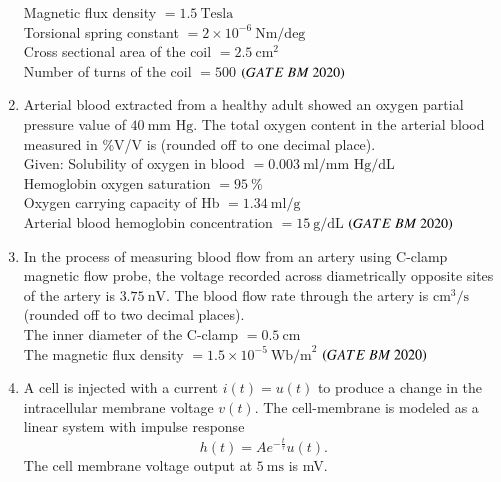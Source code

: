 \documentclass[journal,12pt,onecolumn]{IEEEtran}
\theoremstyle{remark}
\begin{document}
\begin{enumerate}
Magnetic flux density $= 1.5 \ \text{Tesla}$\\

Torsional spring constant $= 2 \times 10^{-6} \ \text{Nm/deg}$\\

Cross sectional area of the coil $= 2.5 \ \text{cm}^2$\\

Number of turns of the coil $= 500$  \hfill $\left(GATE\ BM\ 2020\right)$

\item Arterial blood extracted from a healthy adult showed an oxygen partial pressure 
value of $40 \ \text{mm Hg}$. The total oxygen content in the arterial blood measured 
in \%V/V is \underline{\hspace{2cm}}  (rounded off to one decimal place).\\

Given: Solubility of oxygen in blood $= 0.003 \ \text{ml/mm Hg/dL}$\\

Hemoglobin oxygen saturation $= 95 \ \%$\\

Oxygen carrying capacity of Hb $= 1.34 \ \text{ml/g}$\\

Arterial blood hemoglobin concentration $= 15 \ \text{g/dL}$  \hfill $\left(GATE\ BM\ 2020\right)$

\item In the process of measuring blood flow from an artery using C-clamp magnetic 
flow probe, the voltage recorded across diametrically opposite sites of the artery 
is $3.75 \ \text{nV}$. The blood flow rate through the artery is  \underline{\hspace{2cm}}$\text{cm}^3/\text{s}$ 
(rounded off to two decimal places).\\

The inner diameter of the C-clamp $= 0.5 \ \text{cm}$\\

The magnetic flux density $= 1.5 \times 10^{-5} \ \text{Wb/m}^2$
 \hfill $\left(GATE\ BM\ 2020\right)$
 
\item A cell is injected with a current $i(t) = u(t)$ to produce a change in the 
intracellular membrane voltage $v(t)$. The cell-membrane is modeled as a 
linear system with impulse response 
\[
h(t) = A e^{-\frac{t}{\tau}} u(t).
\]
The cell membrane voltage output at $5 \ \text{ms}$ is \underline{\hspace{2cm}} mV.\\


\end{enumerate}
\end{document}
